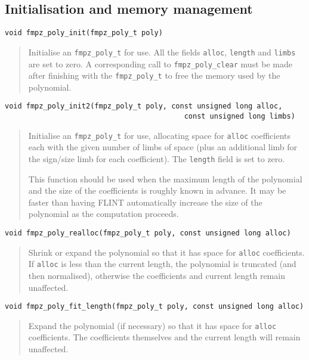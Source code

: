 \documentclass[a4paper,10pt]{article}
\newcommand{\code}{\lstinline}
\begin{document}
\subsection{Initialisation and memory management}

\begin{lstlisting}
void fmpz_poly_init(fmpz_poly_t poly)
\end{lstlisting}
\begin{quote}
Initialise an \code{fmpz_poly_t} for use. All the fields \code{alloc}, \code{length} and \code{limbs} are set to zero. A corresponding call to \code{fmpz_poly_clear} must be made after finishing with the \code{fmpz_poly_t} to free the memory used by the polynomial.
\end{quote}

\begin{lstlisting}
void fmpz_poly_init2(fmpz_poly_t poly, const unsigned long alloc, 
                                          const unsigned long limbs)
\end{lstlisting}
\begin{quote}
Initialise an \code{fmpz_poly_t} for use, allocating space for \code{alloc} coefficients each with the given number of limbs of space (plus an additional limb for the sign/size limb for each coefficient). The \code{length} field is set to zero. 

This function should be used when the maximum length of the polynomial and the size of the coefficients is roughly known in advance. It may be faster than having FLINT automatically increase the size of the polynomial as the computation proceeds. 
\end{quote}

\begin{lstlisting}
void fmpz_poly_realloc(fmpz_poly_t poly, const unsigned long alloc)
\end{lstlisting}
\begin{quote}
Shrink or expand the polynomial so that it has space for \code{alloc} coefficients. If \code{alloc} is less than the current length, the polynomial is truncated (and then normalised), otherwise the coefficients and current length remain unaffected.
\end{quote}

\begin{lstlisting}
void fmpz_poly_fit_length(fmpz_poly_t poly, const unsigned long alloc)
\end{lstlisting}
\begin{quote}
Expand the polynomial (if necessary) so that it has space for \code{alloc} coefficients. The coefficients themselves and the current length will remain unaffected.
\end{quote}
\end{document}
